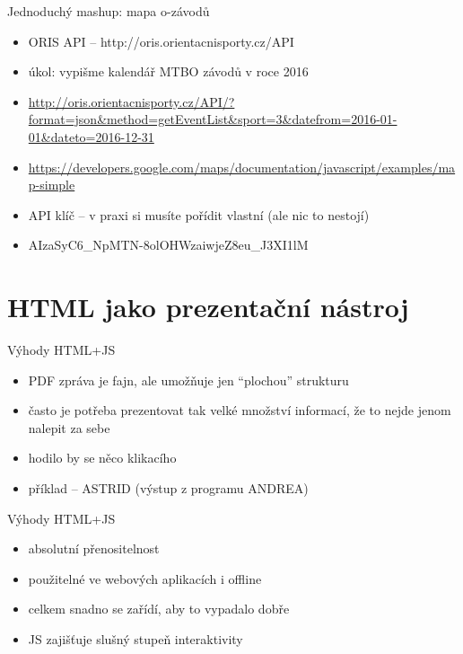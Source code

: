 \documentclass{beamer}
\begin{document}
\begin{frame}{Jednoduchý mashup: mapa o-závodů}
  \begin{itemize}
    \item ORIS API -- http://oris.orientacnisporty.cz/API
    \item úkol: vypišme kalendář MTBO závodů v roce 2016
    \item {\tiny \url{http://oris.orientacnisporty.cz/API/?format=json\&method=getEventList\&sport=3\&datefrom=2016-01-01\&dateto=2016-12-31}}
    \item {\tiny \url{https://developers.google.com/maps/documentation/javascript/examples/map-simple}}
    \item API klíč -- v praxi si musíte pořídit vlastní (ale nic to nestojí)
    \item AIzaSyC6\_NpMTN-8olOHWzaiwjeZ8eu\_J3XI1lM
  \end{itemize}
\end{frame}


\section{HTML jako prezentační nástroj}

\begin{frame}{Výhody HTML+JS}
  \begin{itemize}
    \item PDF zpráva je fajn, ale umožňuje jen ``plochou'' strukturu
    \item často je potřeba prezentovat tak velké množství informací, že to nejde jenom nalepit za sebe
    \item hodilo by se něco klikacího
    \item příklad -- ASTRID (výstup z programu ANDREA)
  \end{itemize}
\end{frame}

\begin{frame}{Výhody HTML+JS}
  \begin{itemize}
    \item absolutní přenositelnost
    \item použitelné ve webových aplikacích i offline
    \item celkem snadno se zařídí, aby to vypadalo dobře
    \item JS zajišťuje slušný stupeň interaktivity
  \end{itemize}
\end{frame}
\end{document}
